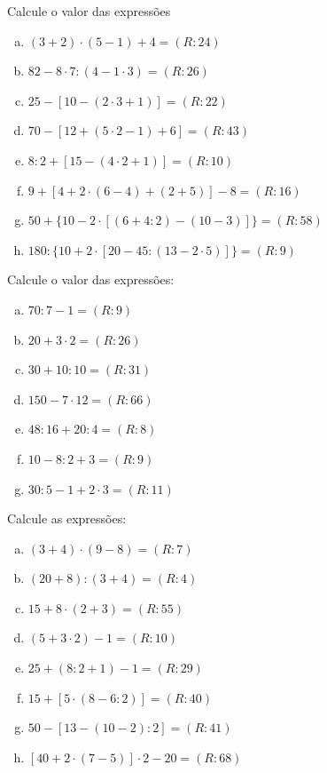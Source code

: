 \item Calcule o valor das expressões
	\begin{multicols}{2}
	\begin{enumerate}[a)]
		\item $(3+2)\cdot(5-1)+4                    = (R:24)$
		\item $82-8\cdot7:(4-1\cdot3)                   = (R:26)$
		\item $25-[10-(2\cdot3+1)]                 = (R:22)$
		\item $70-[12+(5\cdot2-1)+6]             = (R:43)$
		\item $8:2+[15-(4\cdot2+1)]                = (R:10)$
		\item $9+[4+2\cdot(6-4)+(2+5)]-8                   = (R:16)$
		\item $50+\{10-2\cdot[(6+4:2)-(10-3)]\}                      = (R:58)$
		\item $180:\{10+2\cdot[20-45:(13-2\cdot5)]\}                    = (R:9)$
	\end{enumerate}
	\end{multicols}



\item Calcule o valor das expressões:
	\begin{multicols}{2}
	\begin{enumerate}[a)]
		\item $70:7-1                     = (R:9)$
		\item $20+3\cdot2= (R:26)$
		\item $30+10:10                = (R:31)$
		\item $150-7\cdot12                = (R:66)$
		\item $48:16+20:4             = (R:8)$
		\item $10-8:2+3                 = (R:9)$
		\item $30:5-1+2\cdot3             = (R:11)$
	\end{enumerate}
	\end{multicols}


\item Calcule as expressões:
	\begin{multicols}{2}
	\begin{enumerate}[a)]
		\item $(3+4)\cdot(9-8)                         = (R:7)$
		\item $(20+8):(3+4)                      = (R:4)$
		\item $15+8\cdot(2+3)                        = (R:55)$
		\item $(5+3\cdot2)-1                           = (R:10)$
		\item $25+(8:2+1)-1                      = (R:29)$
		\item $15+[5\cdot(8-6:2)]                    = (R:40)$
		\item $50-[13-(10-2):2]                 = (R:41)$
		\item $[40+2\cdot(7-5)]\cdot2-20             = (R:68)$
	\end{enumerate}
	\end{multicols}

